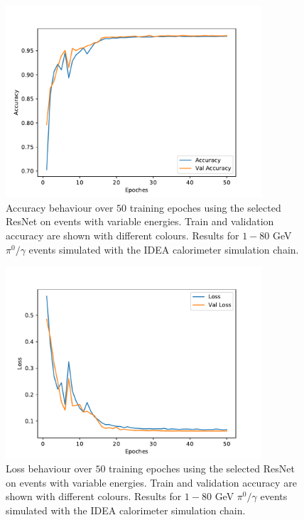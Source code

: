 \begin{figure}
	\centering
	\includegraphics[width=0.85\textwidth]{IMG/Cap6/Res_ERange_accuracy.pdf}
	\caption{Accuracy behaviour over $50$ training epoches using the selected ResNet on events with variable energies. Train and validation accuracy are shown with different colours. Results for $1-80$ GeV $\pi^0/\gamma$ events simulated with the IDEA calorimeter simulation chain.}
	\label{fig:ResNet_acc_ERange}
\end{figure}

\begin{figure}
	\centering
	\includegraphics[width=0.85\textwidth]{IMG/Cap6/Res_ERange_Loss.pdf}
	\caption{Loss behaviour over $50$ training epoches using the selected ResNet on events with variable energies. Train and validation accuracy are shown with different colours. Results for $1-80$ GeV $\pi^0/\gamma$ events simulated with the IDEA calorimeter simulation chain.}
	\label{fig:ResNet_loss_ERange}
\end{figure}

